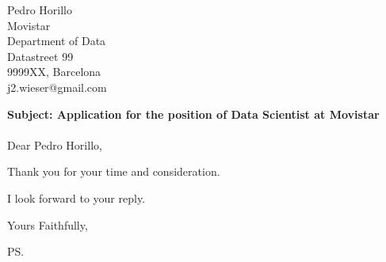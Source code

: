 \documentclass{letter}
\makeatletter
\newcommand{\letterdate}{1/1/2021}
\newcommand{\jobopening}{Data Scientist}
\newcommand{\companynameperson}{Pedro Horillo}
\newcommand{\companyname}{Movistar}
\newcommand{\companydepartment}{Department of Data}
\newcommand{\companystreet}{Datastreet 99}
\newcommand{\companypostal}{9999XX}
\newcommand{\companycity}{Barcelona}
\newcommand{\companyemail}{j2.wieser@gmail.com}
\makeatother
\begin{document}
\begin{letter}{\companynameperson \\ \companyname \\ \companydepartment \\ \companystreet \\ \companypostal, \companycity \\ \companyemail}


	\opening{
		{\bf Subject: Application for the position of {\jobopening} at \companyname} \\ ~ \\
	          Dear \companynameperson,
	}

%	

	Thank you for your time and consideration.

	I look forward to your reply.

	\closing{Yours Faithfully,}

	\ps


\end{letter}
\end{document}
